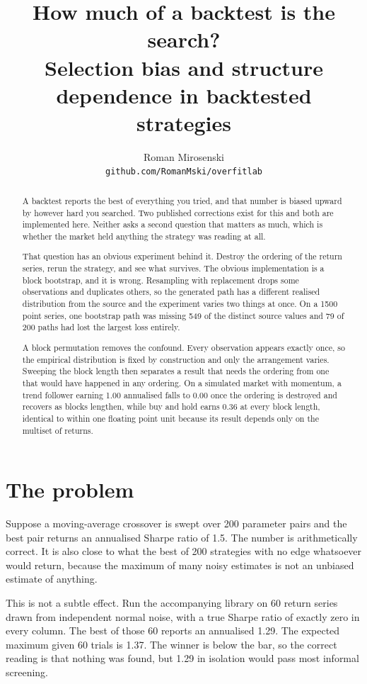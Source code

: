 \documentclass[11pt]{article}
\title{\textbf{How much of a backtest is the search?}\\[4pt]
\large Selection bias and structure dependence in backtested strategies}
\author{Roman Mirosenski\\[2pt]\small\texttt{github.com/RomanMski/overfitlab}}
\date{}
\begin{document}
\maketitle

\begin{abstract}
A backtest reports the best of everything you tried, and that number is biased upward by however hard you searched. Two published corrections exist for this and both are implemented here. Neither asks a second question that matters as much, which is whether the market held anything the strategy was reading at all.

That question has an obvious experiment behind it. Destroy the ordering of the return series, rerun the strategy, and see what survives. The obvious implementation is a block bootstrap, and it is wrong. Resampling with replacement drops some observations and duplicates others, so the generated path has a different realised distribution from the source and the experiment varies two things at once. On a 1500 point series, one bootstrap path was missing 549 of the distinct source values and 79 of 200 paths had lost the largest loss entirely.

A block permutation removes the confound. Every observation appears exactly once, so the empirical distribution is fixed by construction and only the arrangement varies. Sweeping the block length then separates a result that needs the ordering from one that would have happened in any ordering. On a simulated market with momentum, a trend follower earning 1.00 annualised falls to 0.00 once the ordering is destroyed and recovers as blocks lengthen, while buy and hold earns 0.36 at every block length, identical to within one floating point unit because its result depends only on the multiset of returns.
\end{abstract}

\section{The problem}

Suppose a moving-average crossover is swept over 200 parameter pairs and the best pair returns an annualised Sharpe ratio of 1.5. The number is arithmetically correct. It is also close to what the best of 200 strategies with no edge whatsoever would return, because the maximum of many noisy estimates is not an unbiased estimate of anything.

This is not a subtle effect. Run the accompanying library on 60 return series drawn from independent normal noise, with a true Sharpe ratio of exactly zero in every column. The best of those 60 reports an annualised 1.29. The expected maximum given 60 trials is 1.37. The winner is below the bar, so the correct reading is that nothing was found, but 1.29 in isolation would pass most informal screening.
\end{document}
